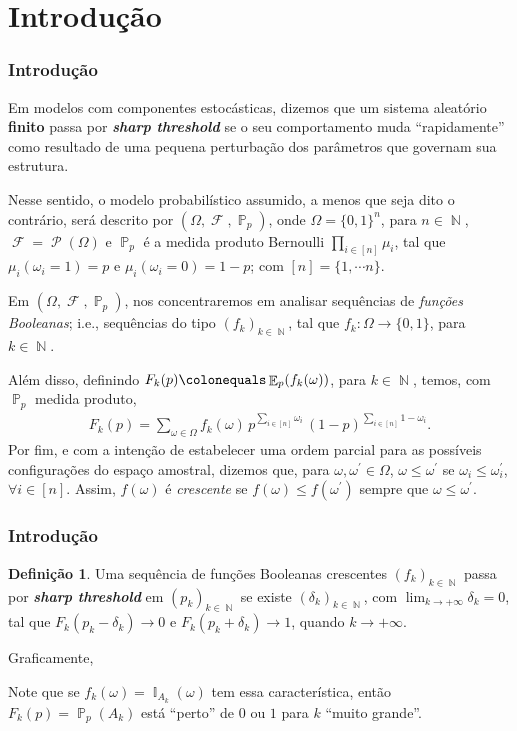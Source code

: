 \documentclass[9pt]{beamer}
\theoremstyle{definition} %
\newtheorem{mydef}{Definição}
\DeclareMathOperator{\PX}{\mathbb{P}} %
\DeclareMathOperator{\EX}{\mathbb{E}} %
\DeclareMathOperator{\FX}{\mathcal{F}} %
\DeclareMathOperator{\NX}{\mathbb{N}} %
\DeclareMathOperator{\IX}{\mathbb{I}} %
\DeclareMathOperator{\PL}{\mathcal{P}} %
\begin{document}
	\section{Introdução}
	\begin{frame}[t]
		\frametitle{Introdução}	
		Em modelos com componentes estocásticas, dizemos que um sistema aleatório \textbf{finito} passa por \textbf{\emph{sharp threshold}} se o seu comportamento muda ``rapidamente'' como resultado de uma pequena perturbação dos parâmetros que governam sua estrutura.
		\pause
		
		Nesse sentido, o modelo probabilístico assumido, a menos que seja dito o contrário, será descrito
		por $(\Omega, \FX, \PX_p)$, onde $\Omega = \{0,1\}^n$, para $n \in \NX$, $\FX = \PL(\Omega)$ e $\PX_p$ é a medida produto Bernoulli $\prod_{i \in [n]} \mu_i$, tal que $\mu_i(\omega_i = 1) = p$ e $\mu_i(\omega_i = 0) = 1-p$; com $[n] = \{1, \cdots n\}$.
		\pause
		
		Em $(\Omega, \FX, \PX_p)$, nos concentraremos em analisar sequências de \textit{funções Booleanas}; i.e., sequências do tipo $(f_k)_{k \in \NX}$, tal que $f_k: \Omega \to \{0, 1\}$, para $k \in \NX$.
		
		Além disso, definindo $F_k(p) \colonequals \EX_p(f_k(\omega))$, para $k \in \NX$, temos, com $\PX_p$ medida produto,
		\vspace{-6pt}
		\begin{align}\label{eq-sharp-threshold}
			F_k(p) = \sum_{\omega \in \Omega} f_k(\omega) \, p^{\sum_{i \in [n]} \omega_i} \, (1 - p)^{\sum_{i \in [n]} 1 - \omega_i}.
		\end{align}
		\pause
		Por fim, e com a intenção de estabelecer uma ordem parcial para as possíveis configurações do espaço amostral, dizemos que, para $\omega, \omega^{\prime} \in \Omega$, $\omega \leq \omega^{\prime}$ se $\omega_i \leq \omega_i^{\prime}$, $\forall i \in [n]$. Assim, $f(\omega)$ é \textit{crescente} se $f(\omega) \leq f(\omega^{\prime})$ sempre que $\omega \leq \omega^{\prime}$.
	\end{frame}

	\begin{frame}[t]
		\frametitle{Introdução}	
		\begin{mydef}
			Uma sequência de funções Booleanas crescentes $(f_k)_{k \in \NX}$ passa por \textit{\textbf{sharp threshold}} em $(p_k)_{k \in \NX}$ se existe $(\delta_k)_{k \in \NX}$, com $\lim_{k \rightarrow +\infty} \delta_k = 0$, tal que $F_k(p_k - \delta_k) \to 0$ e $F_k(p_k + \delta_k) \to 1$, quando $k \rightarrow +\infty$.
		\end{mydef}
		Graficamente,
		\vspace{-9pt}
		
		\vspace{-18pt}\pause
		Note que se $f_k(\omega) = \IX_{A_k}(\omega)$ tem essa característica, então $F_k(p) = \PX_p(A_k)$ está ``perto'' de $0$ ou $1$ para $k$ ``muito grande''.
	\end{frame}
\end{document}
